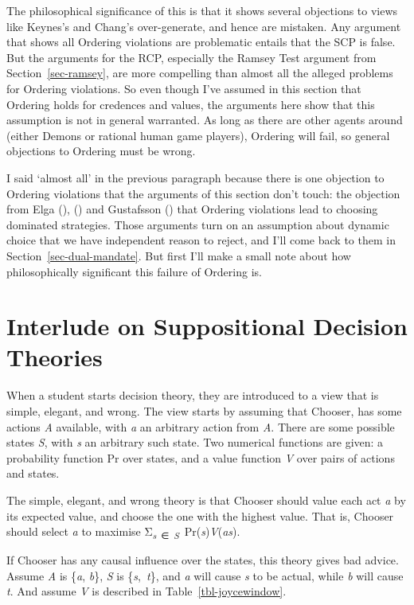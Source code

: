 \documentclass[
  10pt,
  letterpaper,
  DIV=11,
  numbers=noendperiod,
  twoside]{scrartcl}
\begin{document}
The philosophical significance of this is that it shows several
objections to views like Keynes's and Chang's over-generate, and hence
are mistaken. Any argument that shows all Ordering violations are
problematic entails that the SCP is false. But the arguments for the
RCP, especially the Ramsey Test argument from Section~\ref{sec-ramsey},
are more compelling than almost all the alleged problems for Ordering
violations. So even though I've assumed in this section that Ordering
holds for credences and values, the arguments here show that this
assumption is not in general warranted. As long as there are other
agents around (either Demons or rational human game players), Ordering
will fail, so general objections to Ordering must be wrong.

I said `almost all' in the previous paragraph because there is one
objection to Ordering violations that the arguments of this section
don't touch: the objection from Elga (),
() and Gustafsson
() that Ordering violations lead to
choosing dominated strategies. Those arguments turn on an assumption
about dynamic choice that we have independent reason to reject, and I'll
come back to them in Section~\ref{sec-dual-mandate}. But first I'll make
a small note about how philosophically significant this failure of
Ordering is.

\section{Interlude on Suppositional Decision
Theories}\label{sec-suppositional}

When a student starts decision theory, they are introduced to a view
that is simple, elegant, and wrong. The view starts by assuming that
Chooser, has some actions \emph{A} available, with \emph{a} an arbitrary
action from \emph{A}. There are some possible states \emph{S}, with
\emph{s} an arbitrary such state. Two numerical functions are given: a
probability function Pr over states, and a value function \emph{V} over
pairs of actions and states.

The simple, elegant, and wrong theory is that Chooser should value each
act \emph{a} by its expected value, and choose the one with the highest
value. That is, Chooser should select \emph{a} to maximise
Σ\textsubscript{\emph{s}~∈~\emph{S}}~Pr(\emph{s})\emph{V}(\emph{as}).

If Chooser has any causal influence over the states, this theory gives
bad advice. Assume \emph{A} is \{\emph{a}, \emph{b}\}, \emph{S} is
\{\emph{s},~\emph{t}\}, and \emph{a} will cause \emph{s} to be actual,
while \emph{b} will cause \emph{t}. And assume \emph{V} is described in
Table~\ref{tbl-joycewindow}.
\end{document}
